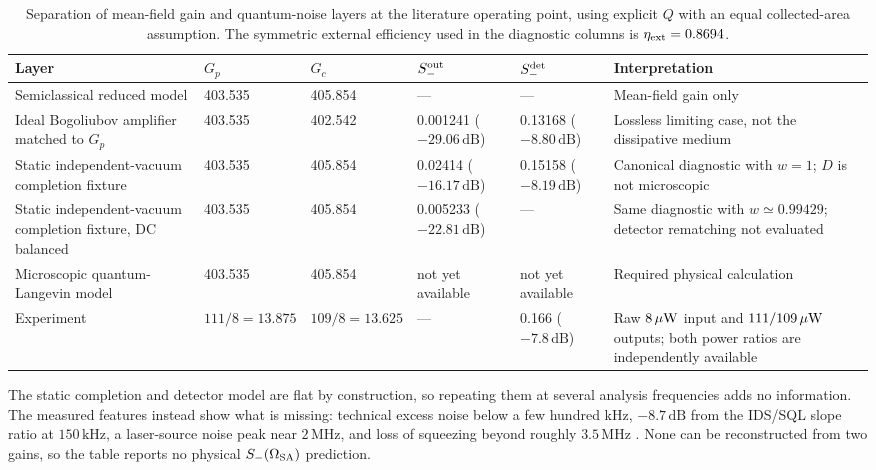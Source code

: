\documentclass[11pt,a4paper]{article}
\newcommand{\MHz}{\,\mathrm{MHz}}
\newcommand{\kHz}{\,\mathrm{kHz}}
\newcommand{\dB}{\,\mathrm{dB}}
\newcommand{\pending}{\textcolor{amber}{not yet available}}
\begin{document}
\begin{table}[ht]
\centering
\caption{Separation of mean-field gain and quantum-noise layers at the
literature operating point, using explicit $Q$ with an equal collected-area
assumption. The symmetric external efficiency used in the diagnostic
columns is $\eta_{\rm ext}=0.8694$.}
\label{tab:model-layer-comparison}
\small
\begin{tabularx}{\textwidth}{L{3.7cm}C{1.35cm}C{1.35cm}C{1.8cm}C{1.8cm}Y}
\toprule
Layer & $G_p$ & $G_c$ & $S_-^{\rm out}$ & $S_-^{\rm det}$ &
Interpretation\\
\midrule
Semiclassical reduced model & 403.535 & 405.854 & --- & --- &
Mean-field gain only\\
Ideal Bogoliubov amplifier matched to $G_p$ & 403.535 & 402.542 &
0.001241 ($-29.06\dB$) & 0.13168 ($-8.80\dB$) &
Lossless limiting case, not the dissipative medium\\
Static independent-vacuum completion fixture & 403.535 & 405.854 &
0.02414 ($-16.17\dB$) & 0.15158 ($-8.19\dB$) &
Canonical diagnostic with $w=1$; $D$ is not microscopic\\
Static independent-vacuum completion fixture, DC balanced & 403.535 & 405.854 &
0.005233 ($-22.81\dB$) & --- &
Same diagnostic with $w\simeq0.99429$; detector rematching not evaluated\\
Microscopic quantum-Langevin model & 403.535 & 405.854 &
\pending & \pending & Required physical calculation\\
Experiment \cite{Sim2025} & $111/8=13.875$ & $109/8=13.625$ & --- &
0.166 ($-7.8\dB$) & Raw $8\,\mu{\rm W}$ input and $111/109\,\mu{\rm W}$
outputs; both power ratios are independently available\\
\bottomrule
\end{tabularx}
\end{table}

The static completion and detector model are flat by construction, so
repeating them at several analysis frequencies adds no information. The
measured features instead show what is missing: technical excess noise below a
few hundred kHz, $-8.7\dB$ from the IDS/SQL slope ratio at $150\kHz$, a
laser-source noise peak near $2\MHz$, and loss of squeezing beyond roughly
$3.5\MHz$ \cite{Sim2025}. None can be reconstructed from two gains, so the
table reports no physical $S_-(\Omega_{\rm SA})$ prediction.
\end{document}
